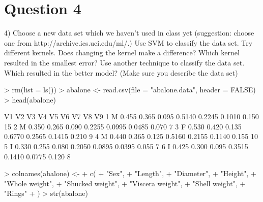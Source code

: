 \documentclass{article}
\begin{document}
\section*{Question 4}

4) Choose a new data set which we haven't used in class yet (suggestion:
choose one from http://archive.ics.uci.edu/ml/.) Use SVM to classify the data
set. Try different kernels. Does changing the kernel make a difference?
Which kernel resulted in the smallest error? Use another technique to classify
the data set. Which resulted in the better model? (Make sure you describe
the data set)

\begin{Schunk}
\begin{Sinput}
> rm(list = ls())
> abalone <- read.csv(file = "abalone.data", header = FALSE)
> head(abalone)
\end{Sinput}
\begin{Soutput}
  V1    V2    V3    V4     V5     V6     V7    V8 V9
1  M 0.455 0.365 0.095 0.5140 0.2245 0.1010 0.150 15
2  M 0.350 0.265 0.090 0.2255 0.0995 0.0485 0.070  7
3  F 0.530 0.420 0.135 0.6770 0.2565 0.1415 0.210  9
4  M 0.440 0.365 0.125 0.5160 0.2155 0.1140 0.155 10
5  I 0.330 0.255 0.080 0.2050 0.0895 0.0395 0.055  7
6  I 0.425 0.300 0.095 0.3515 0.1410 0.0775 0.120  8
\end{Soutput}
\begin{Sinput}
> colnames(abalone) <-
+   c(
+     "Sex",
+     "Length",
+     "Diameter",
+     "Height",
+     "Whole weight",
+     "Shucked weight",
+     "Viscera weight",
+     "Shell weight",
+     "Rings"
+   )
> str(abalone)
\end{Sinput}
\end{Schunk}
\end{document}
